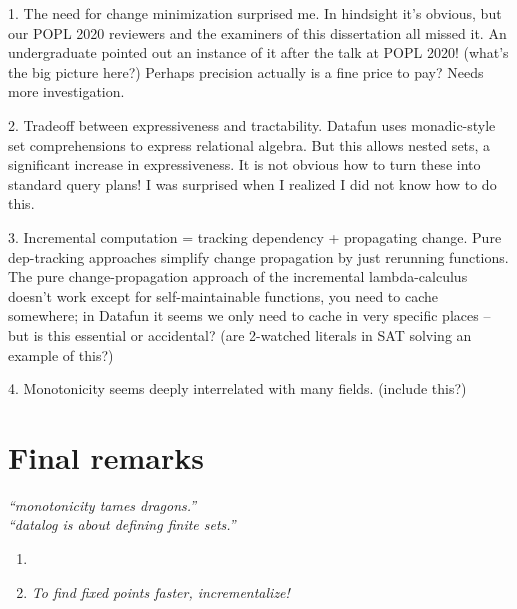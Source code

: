 1. The need for change minimization surprised me. In hindsight it's obvious, but our POPL 2020 reviewers and the examiners of this dissertation all missed it. An undergraduate pointed out an instance of it after the talk at POPL 2020! (what's the big picture here?) Perhaps precision actually is a fine price to pay? Needs more investigation.

2. Tradeoff between expressiveness and tractability. Datafun uses monadic-style set comprehensions to express relational algebra. But this allows nested sets, a significant increase in expressiveness. It is not obvious how to turn these into standard query plans! I was surprised when I realized I did not know how to do this.

3. Incremental computation = tracking dependency + propagating change. Pure dep-tracking approaches simplify change propagation by just rerunning functions. The pure change-propagation approach of the incremental lambda-calculus doesn't work except for self-maintainable functions, you need to cache somewhere; in Datafun it seems we only need to cache in very specific places -- but is this essential or accidental? (are 2-watched literals in SAT solving an example of this?)

4. Monotonicity seems deeply interrelated with many fields. (include this?)


\section{Final remarks}

\noindent
\emph{``monotonicity tames dragons.''}\\
\emph{``datalog is about defining finite sets.''}

\begin{enumerate}
\item {}
\item {} \emph{To find fixed points faster, incrementalize!}
\end{enumerate}

\XXX
